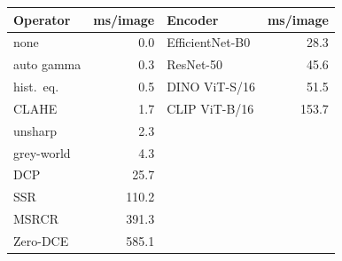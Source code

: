\begin{tabular}{lrlr}
\toprule
Operator & ms/image & Encoder & ms/image \\
\midrule
none & 0.0 & EfficientNet-B0 & 28.3 \\
auto gamma & 0.3 & ResNet-50 & 45.6 \\
hist.\ eq. & 0.5 & DINO ViT-S/16 & 51.5 \\
CLAHE & 1.7 & CLIP ViT-B/16 & 153.7 \\
unsharp & 2.3 &  &  \\
grey-world & 4.3 &  &  \\
DCP & 25.7 &  &  \\
SSR & 110.2 &  &  \\
MSRCR & 391.3 &  &  \\
Zero-DCE & 585.1 &  &  \\
\bottomrule
\end{tabular}